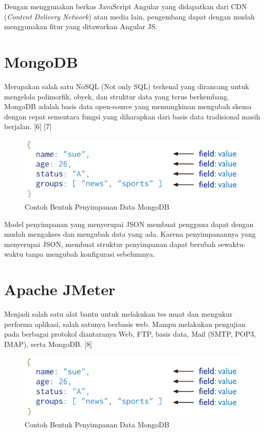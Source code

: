 \documentclass{ta-its}
\begin{document}
			Dengan menggunakan berkas JavaScript Angular yang didapatkan dari CDN (\textit{Content Delivery Network}) atau media lain, pengembang dapat dengan mudah menggunakan fitur yang ditawarkan Angular JS.
			
		\section{MongoDB}
			Merupakan salah satu NoSQL (Not only SQL) terkenal yang dirancang untuk mengelola polimorfik, obyek, dan struktur data yang terus berkembang. MongoDB adalah basis data open-source yang memungkinan mengubah skema dengan cepat sementara fungsi yang diharapkan dari basis data tradisional masih berjalan. [6] [7]
			
			\begin{figure}[h] %
				\centering
				\includegraphics[width=\linewidth]{contoh_img/contoh_mongodb}
				\caption{Contoh Bentuk Penyimpanan Data MongoDB}
				\label{contohMongoDB}
			\end{figure}
			
			Model penyimpanan yang menyerupai JSON membuat pengguna dapat dengan mudah mengakses dan mengubah data yang ada. Karena penyimpanannya yang menyerupai JSON, membuat struktur penyimpanan dapat berubah sewaktu-waktu tanpa mengubah konfigurasi sebelumnya.
		
		\section{Apache JMeter}
			Menjadi salah satu alat bantu untuk melakukan tes muat dan mengukur performa aplikasi, salah satunya berbasis web. Mampu melakukan pengujian pada berbagai protokol diantaranya Web, FTP, basis data, Mail (SMTP, POP3, IMAP), serta MongoDB. [8]
			
			\begin{figure}[h] %
				\centering
				\includegraphics[width=\linewidth]{contoh_img/contoh_mongodb}
				\caption{Contoh Bentuk Penyimpanan Data MongoDB}
				\label{contohMongoDB}
			\end{figure}
			
\end{document}
